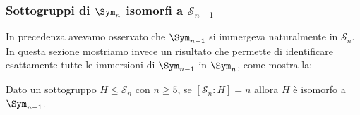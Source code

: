 \documentclass[11pt]{scrartcl}
\begin{document}
	
	\subsubsection{Sottogruppi di \texorpdfstring{$\Sym_n$}{Sₙ} isomorfi a \texorpdfstring{$\mathcal{S}_{n-1}$}{Sₙ₋₁}}
	
	In precedenza avevamo osservato che $\Sym_{n - 1}$ si immergeva naturalmente in $\mathcal{S}_n$.
	In questa sezione mostriamo invece un risultato che permette di identificare esattamente tutte le
	immersioni di $\Sym_{n-1}$ in $\Sym_n$, come mostra la:
	
	\begin{proposition}
		\label{prop1.68}
		Dato un sottogruppo $H\leqslant \mathcal{S}_n$ con $n \geq 5$, se $[\mathcal{S}_n : H] = n$ allora $H$ è 
		isomorfo a $\Sym_{n - 1}$.
	\end{proposition}
	
\end{document}
